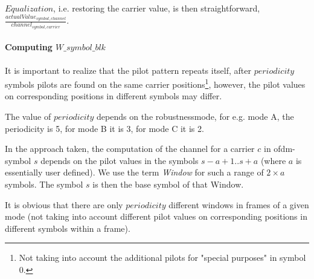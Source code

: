 \documentclass[11pt]{article}
\begin{document}
$Equalization$, i.e. restoring the carrier value, is then straightforward,
{
\ \\
$\frac{actualValue_{symbol, channel}}{channel_{symbol, carrier}}$.
\ \\
}
\paragraph{Computing $W\_symbol\_blk$}
It is important to realize that the
pilot pattern repeats itself, after $periodicity$ symbols
pilots are found on the same carrier
positions\footnote{Not taking into account the
additional pilots for "special purposes" in symbol 0.},
however, the pilot values on corresponding positions in
different symbols may differ.

The value of $periodicity$
depends on the robustnessmode,
for e.g. mode A, the periodicity is 5, for mode B
it is 3, for mode C it is 2.

In the approach taken, the computation of the channel for a carrier $c$
in ofdm-symbol $s$ depends on
the pilot values in the symbols $s - a + 1 .. s + a$
(where $a$ is essentially user defined).
We use the term {\em Window} for such a range of $2 \times a$ symbols.
The symbol $s$ is then the base symbol of that Window.

It is obvious that there are only $periodicity$ different windows in 
frames of a given mode (not taking into account different pilot values
on corresponding positions in different symbols within a frame).
\end{document}
